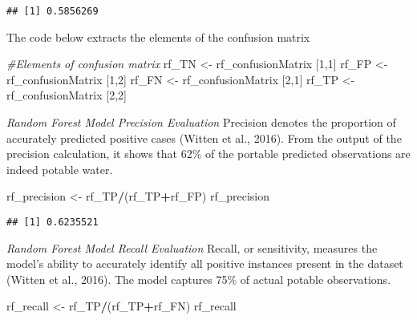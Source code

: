 \documentclass[
]{article}
\newenvironment{Shaded}{\begin{snugshade}}{\end{snugshade}}
\newcommand{\CommentTok}[1]{\textcolor[rgb]{0.56,0.35,0.01}{\textit{#1}}}
\newcommand{\DecValTok}[1]{\textcolor[rgb]{0.00,0.00,0.81}{#1}}
\newcommand{\NormalTok}[1]{#1}
\newcommand{\OtherTok}[1]{\textcolor[rgb]{0.56,0.35,0.01}{#1}}
\newcommand{\SpecialCharTok}[1]{\textcolor[rgb]{0.81,0.36,0.00}{\textbf{#1}}}
\begin{document}
\begin{verbatim}
## [1] 0.5856269
\end{verbatim}

The code below extracts the elements of the confusion matrix

\begin{Shaded}
\begin{Highlighting}[]
\CommentTok{\#Elements of confusion matrix}
\NormalTok{rf\_TN }\OtherTok{\textless{}{-}}\NormalTok{ rf\_confusionMatrix [}\DecValTok{1}\NormalTok{,}\DecValTok{1}\NormalTok{]}
\NormalTok{rf\_FP }\OtherTok{\textless{}{-}}\NormalTok{ rf\_confusionMatrix [}\DecValTok{1}\NormalTok{,}\DecValTok{2}\NormalTok{]}
\NormalTok{rf\_FN }\OtherTok{\textless{}{-}}\NormalTok{ rf\_confusionMatrix [}\DecValTok{2}\NormalTok{,}\DecValTok{1}\NormalTok{]}
\NormalTok{rf\_TP }\OtherTok{\textless{}{-}}\NormalTok{ rf\_confusionMatrix [}\DecValTok{2}\NormalTok{,}\DecValTok{2}\NormalTok{]}
\end{Highlighting}
\end{Shaded}

\emph{Random Forest Model Precision Evaluation} Precision denotes the
proportion of accurately predicted positive cases (Witten et al., 2016).
From the output of the precision calculation, it shows that 62\% of the
portable predicted observations are indeed potable water.

\begin{Shaded}
\begin{Highlighting}[]
\NormalTok{rf\_precision }\OtherTok{\textless{}{-}}\NormalTok{ rf\_TP}\SpecialCharTok{/}\NormalTok{(rf\_TP}\SpecialCharTok{+}\NormalTok{rf\_FP)}
\NormalTok{rf\_precision}
\end{Highlighting}
\end{Shaded}

\begin{verbatim}
## [1] 0.6235521
\end{verbatim}

\emph{Random Forest Model Recall Evaluation} Recall, or sensitivity,
measures the model's ability to accurately identify all positive
instances present in the dataset (Witten et al., 2016). The model
captures 75\% of actual potable observations.

\begin{Shaded}
\begin{Highlighting}[]
\NormalTok{rf\_recall }\OtherTok{\textless{}{-}}\NormalTok{ rf\_TP}\SpecialCharTok{/}\NormalTok{(rf\_TP}\SpecialCharTok{+}\NormalTok{rf\_FN)}
\NormalTok{rf\_recall}
\end{Highlighting}
\end{Shaded}
\end{document}
